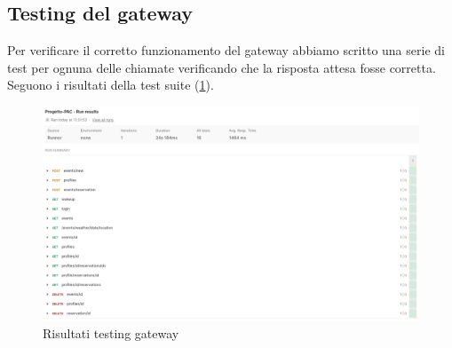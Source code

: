 \subsection{Testing del gateway}
Per verificare il corretto funzionamento del gateway abbiamo scritto una serie di test per ognuna delle chiamate verificando che la risposta attesa fosse corretta. Seguono i risultati della test suite (\ref{fig:risTestGateway}).
\begin{figure}[h!]
  \includegraphics[width=1\textwidth]{images/gatewayTest.png}
  \caption{Risultati testing gateway}
  \label{fig:risTestGateway}
\end{figure}